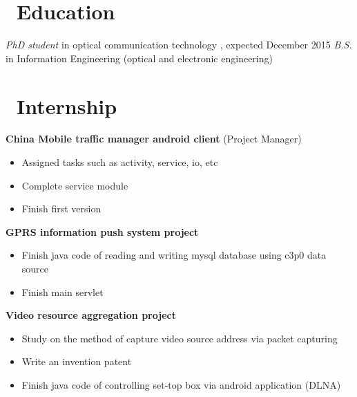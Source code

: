 \documentclass{resume}
\begin{document}


 
\section{\faGraduationCap\ Education}
\textit{PhD student} in optical communication technology , expected December 2015
\textit{B.S.} in Information Engineering (optical and electronic engineering)

\section{\faUsers\ Internship}
\vspace{1mm}

\textbf{China Mobile traffic manager android client} (Project Manager)
\begin{itemize}
  \item Assigned tasks such as activity, service, io, etc
  \item Complete service module
  \item Finish first version
\end{itemize}

\textbf{GPRS information push system project}
\begin{itemize}
  \item Finish java code of reading and writing mysql database using c3p0 data source
  \item Finish main servlet
\end{itemize}

\textbf{Video resource aggregation project}
\begin{itemize}
  \item Study on the method of capture video source address via packet capturing
  \item Write an invention patent
  \item Finish java code of controlling set-top box via android application (DLNA)
\end{itemize}
\end{document}

